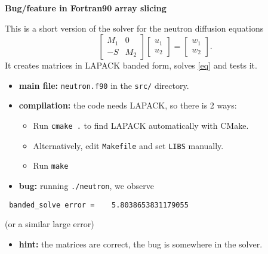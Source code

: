 \documentclass{slides}
\begin{document}
\begin{center}
{\large\bf Bug/feature in Fortran90 array slicing}
\end{center}


This is a short version of the solver for the neutron diffusion equations
\begin{equation}
\begin{bmatrix}
 M_1 & 0 \\
 -S  & M_2
\end{bmatrix}
\begin{bmatrix}
 u_1 \\
 u_2
\end{bmatrix} =
\begin{bmatrix}
 w_1 \\
 w_2
\end{bmatrix}.
\label{eq}
\end{equation}
It creates matrices in LAPACK banded form, solves \eqref{eq} and tests it.


\begin{itemize}
 \item \textbf{main file:} \verb+neutron.f90+ in the \verb+src/+ directory.
 \vspace*{-3ex}
 \item \textbf{compilation:} the code needs LAPACK, so there is 2 ways:
 \begin{itemize}
 \vspace*{-2ex}
  \item Run \verb*+cmake .+ to find LAPACK automatically with CMake.
 \vspace*{-2ex}
  \item Alternatively, edit \verb+Makefile+ and set \verb+LIBS+ manually.
 \vspace*{-2ex}
  \item Run \verb+make+
 \end{itemize}
 \vspace*{-3ex}
 \item \textbf{bug:} running \verb+./neutron+, we observe
\end{itemize}
\vspace*{-3ex}
\begin{verbatim}
 banded_solve error =    5.8038653831179055
\end{verbatim}
\vspace*{-2ex}
(or a similar large error)

\vspace*{-2ex}
\begin{itemize}
 \item \textbf{hint:} the matrices are correct, the bug is somewhere in the solver.
\end{itemize}
\end{document}
